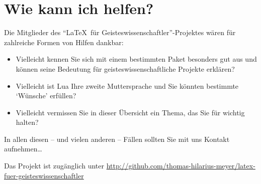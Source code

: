 \documentclass[ngerman]{dtk}
\begin{document}
\section{Wie kann ich helfen?}

Die Mitglieder des \enquote{\LaTeX\ für Geisteswissenschaftler}-Projektes wären für zahlreiche Formen von
Hilfen dankbar:

\begin{itemize}
    \item Vielleicht kennen Sie sich mit einem bestimmten Paket besonders gut aus und können seine Bedeutung
        für geisteswissenschaftliche Projekte erklären?
    \item Vielleicht ist Lua Ihre zweite Muttersprache und Sie könnten bestimmte \enquote*{Wünsche} erfüllen?
    \item Vielleicht vermissen Sie in dieser Übersicht ein Thema, das Sie für wichtig halten?
\end{itemize} 
In allen diesen -- und vielen anderen -- Fällen sollten Sie mit uns Kontakt aufnehmen\ldots

Das Projekt ist zugänglich unter \url{http://github.com/thomas-hilarius-meyer/latex-fuer-geisteswissenschaftler}
\end{document}
